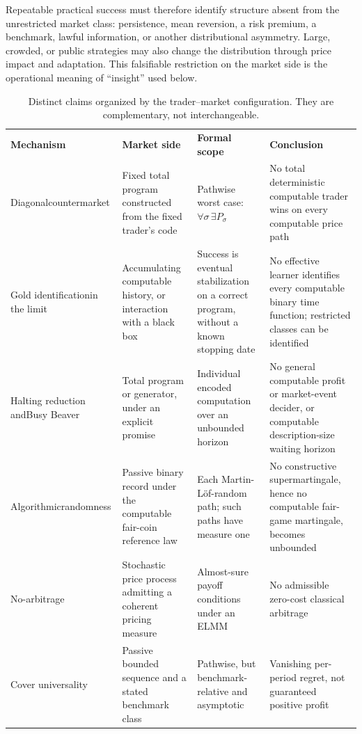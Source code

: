 \documentclass[aps,pra,reprint,superscriptaddress,amsmath,amssymb,floatfix]{revtex4-2}
\theoremstyle{plain}
\theoremstyle{definition}
\theoremstyle{remark}
\begin{document}
Repeatable practical success must therefore identify structure absent from the
unrestricted market class: persistence, mean reversion, a risk premium, a
benchmark, lawful information, or another distributional asymmetry. Large,
crowded, or public strategies may also change the distribution through price
impact and adaptation. This falsifiable restriction on the market side is the
operational meaning of ``insight'' used below.

\begin{table}[t]
\caption{\label{tab:claimmap}Distinct claims organized by the trader--market
configuration. They are complementary, not interchangeable.}
\centering
\begin{ruledtabular}
\begin{tabular}{p{}p{}p{}p{}}
\textbf{Mechanism} & \textbf{Market side} & \textbf{Formal scope}
& \textbf{Conclusion} \\
\colrule
Diagonal\newline\mbox{countermarket}
& Fixed total program constructed from the fixed trader's code
& Pathwise worst case:
\(\forall\sigma\,\exists P_\sigma\)
& No total deterministic computable trader wins on every computable price path \\
Gold identification\newline in the limit
& Accumulating computable history, or interaction with a black box
& Success is eventual stabilization on a correct program, without a known
stopping date
& No effective learner identifies every computable binary time function;
restricted classes can be identified \\
Halting reduction and\newline Busy Beaver
& Total program or generator, under an explicit promise
& Individual encoded computation over an unbounded horizon
& No general computable profit or market-event decider, or computable
description-size waiting horizon \\
Algorithmic\newline randomness
& Passive binary record under the computable fair-coin reference law
& Each Martin-L\"of-random path; such paths have measure one
& No constructive supermartingale, hence no computable fair-game martingale,
becomes unbounded \\
No-arbitrage
& Stochastic price process admitting a coherent pricing measure
& Almost-sure payoff conditions under an ELMM
& No admissible zero-cost classical arbitrage \\
Cover universality
& Passive bounded sequence and a stated benchmark class
& Pathwise, but benchmark-relative and asymptotic
& Vanishing per-period regret, not guaranteed positive profit \\
\end{tabular}
\end{ruledtabular}
\end{table}
\end{document}
